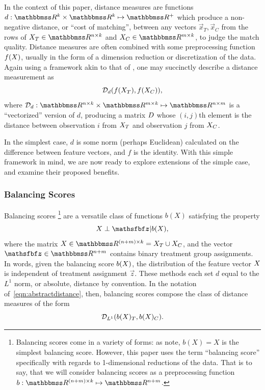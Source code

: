 \documentclass[11pt]{extarticle}
\begin{document}
In the context of this paper, distance measures are functions $d: \reals^k \times \reals^k \mapsto \reals^+$ which produce a non-negative distance, or ``cost of matching'', between any vectors $\vec{x}_T, \vec{x}_C$ from the rows of $\mat{X}_T \in \reals^{n \times k}$ and $\mat{X}_C \in \reals^{m \times k}$, to judge the match quality. Distance measures are often combined with some preprocessing function $f(X)$, usually in the form of a dimension reduction or discretization of the data. Again using a framework akin to that of \textcite{iacus_multivariate_2011}, one may succinctly describe a distance measurement as
\begin{equation}
  \mathcal{D}_d (f(X_T), f(X_C)), \label{eqn:abstractdistance}
\end{equation}
where $\mathcal{D}_d : \reals^{n \times k} \times \reals^{m \times k} \mapsto \reals^{n \times m}$ is a ``vectorized'' version of $d$, producing a matrix $D$ whose $(i, j)$th element is the distance between observation $i$ from $X_T$ and observation $j$ from $X_C$.

In the simplest case, $d$ is some norm (perhaps Euclidean) calculated on the difference between feature vectors, and $f$ is the identity. With this simple framework in mind, we are now ready to explore extensions of the simple case, and examine their proposed benefits.


\subsubsection{Balancing Scores}

Balancing scores
\footnote{Balancing scores come in a variety of forms: as \textcite{rosenbaum_central_1983} note, $b(X) = X$ is the simplest balancing score. However, this paper uses the term ``balancing score'' specifically with regards to 1-dimensional reductions of the data. That is to say, that we will consider balancing scores as a preprocessing function $b: \reals^{(n + m) \times k} \mapsto \reals^{n + m}$.}
\parencite{rosenbaum_central_1983} are a versatile class of functions $b(X)$ satisfying the property
\begin{equation}
  \mat{X} \perp \vec{z} | b(\mat{X}), \label{eqn:defbalancingscore}
\end{equation}
where the matrix $\mat{X} \in \reals^{(n + m) \times k} = \mat{X}_T \cup \mat{X}_C$, and the vector $\vec{z} \in \reals^{n + m}$ contains binary treatment group assignments.
In words, given the balancing score $b(X)$, the distribution of the feature vector $X$ is independent of treatment assignment $\vec{z}$. These methods each set $d$ equal to the $L^1$ norm, or absolute, distance by convention. In the notation of~\eqref{eqn:abstractdistance}, then, balancing scores compose the class of distance measures of the form
\begin{equation}
  \mathcal{D}_{L^1}(b(X)_T, b(X)_C).
\end{equation}
\end{document}
